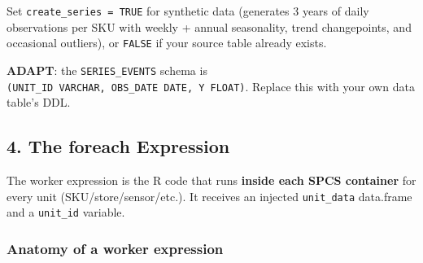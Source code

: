 \documentclass[
]{article}
\begin{document}
Set \texttt{create\_series\ =\ TRUE} for synthetic data (generates 3
years of daily observations per SKU with weekly + annual seasonality,
trend changepoints, and occasional outliers), or \texttt{FALSE} if your
source table already exists.

\textbf{ADAPT}: the \texttt{SERIES\_EVENTS} schema is
\texttt{(UNIT\_ID\ VARCHAR,\ OBS\_DATE\ DATE,\ Y\ FLOAT)}. Replace this
with your own data table's DDL.

\subsection{4. The foreach Expression}\label{the-foreach-expression}

The worker expression is the R code that runs \textbf{inside each SPCS
container} for every unit (SKU/store/sensor/etc.). It receives an
injected \texttt{unit\_data} data.frame and a \texttt{unit\_id}
variable.

\subsubsection{Anatomy of a worker
expression}\label{anatomy-of-a-worker-expression}
\end{document}
